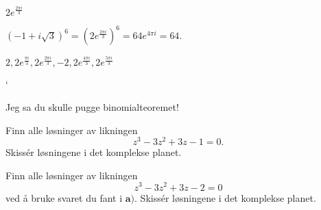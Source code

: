 \begin{losning}
\begin{punkt}
$2e^{\frac{2\pi i}{3}}$
\end{punkt}

\begin{punkt}
$(-1+i\sqrt{3})^6=(2e^{\frac{2\pi i}{3}})^6=64e^{4\pi i}=64.$
\end{punkt}

\begin{punkt}
$2,2e^{\frac{\pi i}{3}},2e^{\frac{2\pi i}{3}},-2,2e^{\frac{4\pi i}{3}},2e^{\frac{5\pi i}{3}}$


\begin{center}`
\end{center}


\end{punkt}

\end{losning}


\begin{oppgave}
Jeg sa du skulle pugge binomialteoremet!
\begin{punkt}
Finn alle løsninger av likningen $$z^3-3z^2+3z-1=0.$$ Skissér løsningene i det komplekse planet.
\end{punkt}
\begin{punkt}
Finn alle løsninger av likningen $$z^3-3z^2+3z-2=0$$ ved å bruke svaret du fant i $\textbf{a)}$. Skissér løsningene i det komplekse planet.
\end{punkt}
\end{oppgave}

